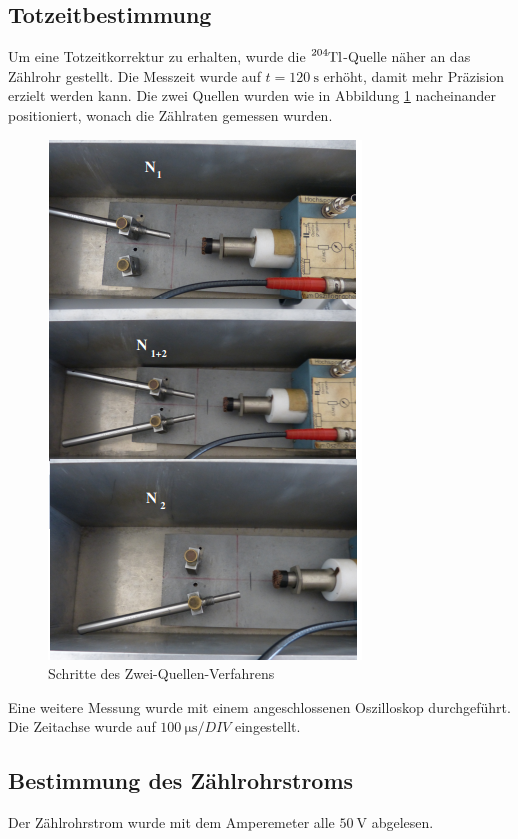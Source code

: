 \subsection{Totzeitbestimmung}
\label{tbes}
Um eine Totzeitkorrektur zu erhalten, wurde die $\ce{^{204}Tl}$-Quelle näher an das Zählrohr gestellt.
Die Messzeit wurde auf $t=\SI{120}{\second}$ erhöht, damit mehr Präzision erzielt werden kann.
Die zwei Quellen wurden wie in Abbildung \ref{fig:zqm} nacheinander positioniert, wonach die Zählraten gemessen wurden.
\begin{figure}
  \centering
  \includegraphics[scale=0.6]{pics/zqmethode.png}
  \caption{Schritte des Zwei-Quellen-Verfahrens}
  \label{fig:zqm}
\end{figure}
Eine weitere Messung wurde mit einem angeschlossenen Oszilloskop durchgeführt. Die Zeitachse wurde auf $\SI{100}{\micro \second \per DIV}$ eingestellt.
\subsection{Bestimmung des Zählrohrstroms}
Der Zählrohrstrom wurde mit dem Amperemeter alle $\SI{50}{\volt}$ abgelesen.